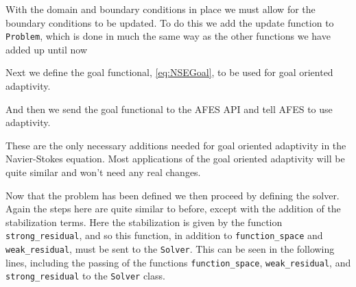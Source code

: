     With the domain and boundary conditions in place we must allow for the
    boundary conditions to be updated. To do this we add the update function to
    \texttt{Problem}, which is done in much the same way as the other functions
    we have added up until now
    
    

    Next we define the goal functional, \eqref{eq:NSEGoal}, to be used for goal
    oriented adaptivity.
    
    And then we send the goal functional to the AFES API and tell AFES to use
    adaptivity.
    
    
    These are the only necessary additions needed for goal oriented adaptivity
    in the Navier-Stokes equation. Most applications of the goal oriented
    adaptivity will be quite similar and won't need any real changes.

    

    Now that the problem has been defined we then proceed by defining the
    solver. Again the steps here are quite similar to before, except with the
    addition of the stabilization terms. Here the stabilization is given by the
    function \texttt{strong\_residual}, and so this function, in addition to
    \texttt{function\_space} and \texttt{weak\_residual}, must be sent to the
    \texttt{Solver}. This can be seen in the following lines, including the
    passing of the functions \texttt{function\_space}, \texttt{weak\_residual},
    and \texttt{strong\_residual} to the \texttt{Solver} class.
    

